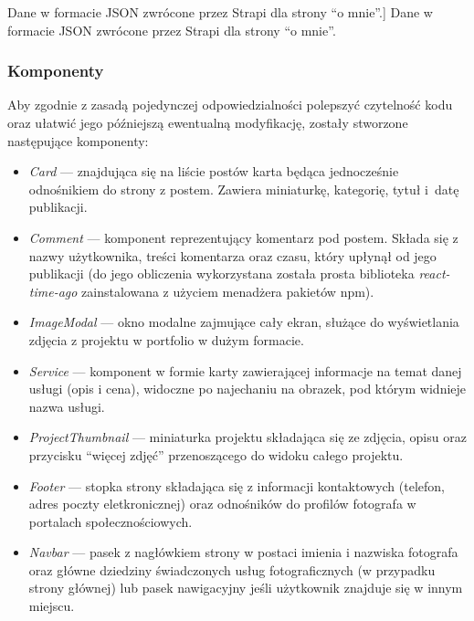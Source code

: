 \documentclass[a4paper, 12pt]{article}
\numberwithin{figure}{section}
\begin{document}
\begin{sloppypar}
\begin{code}[htbp]
    
    \caption
    [Dane w formacie JSON zwrócone przez Strapi dla strony ``o mnie''.]
    {Dane w formacie JSON zwrócone przez Strapi dla strony ``o mnie''.}
    \label{chapter4:strapi_response.txt}
\end{code}

\subsubsection*{Komponenty}

Aby zgodnie z zasadą pojedynczej odpowiedzialności \cite{srp} polepszyć czytelność kodu oraz ułatwić jego późniejszą ewentualną modyfikację, zostały stworzone następujące komponenty:
\begin{itemize}
    \item \textit{Card} --- znajdująca się na liście postów karta będąca jednocześnie odnośnikiem do strony z postem. Zawiera miniaturkę, kategorię, tytuł i~datę publikacji.
    \item \textit{Comment} --- komponent reprezentujący komentarz pod postem. Składa się z nazwy użytkownika, treści komentarza oraz czasu, który upłynął od jego publikacji (do jego obliczenia wykorzystana została prosta biblioteka \textit{react-time-ago} zainstalowana z użyciem menadżera pakietów npm).
    \item \textit{ImageModal} --- okno modalne zajmujące cały ekran, służące do wyświetlania zdjęcia z projektu w portfolio w dużym formacie.
    \item \textit{Service} --- komponent w formie karty zawierającej informacje na temat danej usługi (opis i cena), widoczne po najechaniu na obrazek, pod którym widnieje nazwa usługi.
    \item \textit{ProjectThumbnail} --- miniaturka projektu składająca się ze zdjęcia, opisu oraz przycisku ``więcej zdjęć'' przenoszącego do widoku całego projektu.
    \item \textit{Footer} --- stopka strony składająca się z informacji kontaktowych (telefon, adres poczty eletkronicznej) oraz odnośników do profilów fotografa w portalach społecznościowych.
    \item \textit{Navbar} --- pasek z nagłówkiem strony w postaci imienia i nazwiska fotografa oraz główne dziedziny świadczonych usług fotograficznych (w przypadku strony głównej) lub pasek nawigacyjny jeśli użytkownik znajduje się w innym miejscu.
\end{itemize}


\end{sloppypar}
\end{document}
